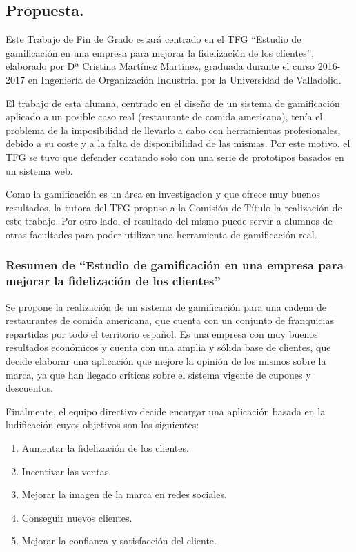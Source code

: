 \documentclass[11pt,a4paper,twoside]{report}
\begin{document}
\subsection{Propuesta.}
Este Trabajo de Fin de Grado estará centrado en el TFG “Estudio de gamificación en una empresa para mejorar la fidelización de los clientes”, elaborado por Dª Cristina Martínez Martínez, graduada durante el curso 2016-2017 en Ingeniería de Organización Industrial por la Universidad de Valladolid.  

El trabajo de esta alumna, centrado en el diseño de un sistema de gamificación aplicado a un posible caso real (restaurante de comida americana), tenía el problema de la imposibilidad de llevarlo a cabo con herramientas profesionales, debido a su coste y a la falta de disponibilidad de las mismas. Por este motivo, el TFG se tuvo que defender contando solo con una serie de prototipos basados en un sistema web. 

Como la gamificación es un área en investigacion y que ofrece muy buenos resultados, la tutora del TFG propuso a la Comisión de Título la realización de este trabajo. Por otro lado, el resultado del mismo puede servir a alumnos de otras facultades para poder utilizar una herramienta de gamificación real.
\subsubsection{Resumen de “Estudio de gamificación en una empresa para mejorar la fidelización de los clientes”}
Se propone la realización de un sistema de gamificación para una cadena de restaurantes de comida americana, que cuenta con un conjunto de franquicias repartidas por todo el territorio español. Es una empresa con muy buenos resultados económicos y cuenta con una amplia y sólida base de clientes, que decide elaborar una aplicación que mejore la opinión de los mismos sobre la marca, ya que han llegado críticas sobre el sistema vigente de cupones y descuentos.

Finalmente, el equipo directivo decide encargar una aplicación basada en la ludificación cuyos objetivos son los siguientes:

\begin{enumerate}
\item Aumentar la fidelización de los clientes.
\item Incentivar las ventas.
\item Mejorar la imagen de la marca en redes sociales.
\item Conseguir nuevos clientes.
\item Mejorar la confianza y satisfacción del cliente. 
\end{enumerate}
\end{document}
